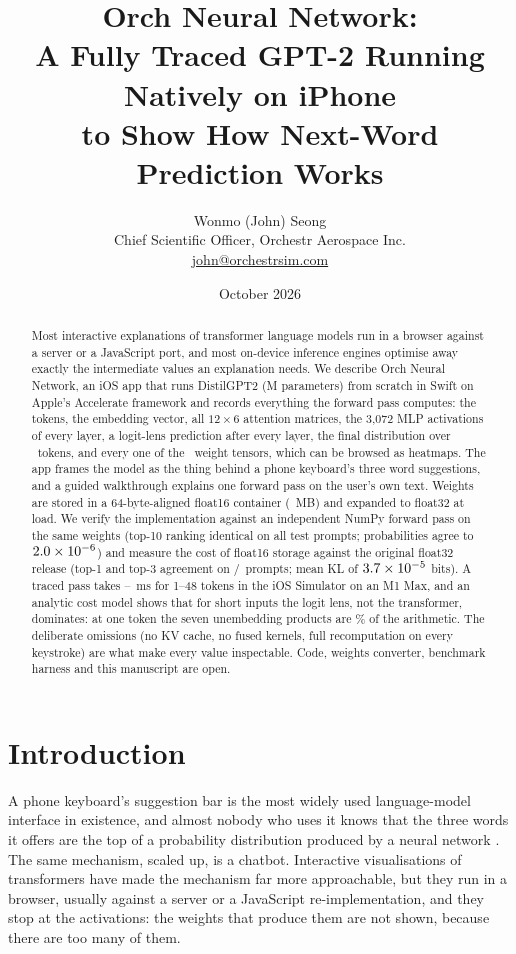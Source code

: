 \documentclass[11pt]{article}
\title{Orch Neural Network:\\A Fully Traced GPT-2 Running Natively on iPhone\\to Show How Next-Word Prediction Works}
\author{Wonmo (John) Seong\\ \small Chief Scientific Officer, Orchestr Aerospace Inc.\\ \small \href{mailto:john@orchestrsim.com}{john@orchestrsim.com}}
\date{October 2026}
\begin{document}
\maketitle

\begin{abstract}
Most interactive explanations of transformer language models run in a browser against a server or a JavaScript port, and most on-device inference engines optimise away exactly the intermediate values an explanation needs. We describe Orch Neural Network, an iOS app that runs DistilGPT2 (\NumParams M parameters) from scratch in Swift on Apple's Accelerate framework and records everything the forward pass computes: the tokens, the embedding vector, all $12\times6$ attention matrices, the 3{,}072 MLP activations of every layer, a logit-lens prediction after every layer, the final distribution over \VocabSize\ tokens, and every one of the \NumTensors\ weight tensors, which can be browsed as heatmaps. The app frames the model as the thing behind a phone keyboard's three word suggestions, and a guided walkthrough explains one forward pass on the user's own text. Weights are stored in a 64-byte-aligned float16 container (\WeightFileMB~MB) and expanded to float32 at load. We verify the implementation against an independent NumPy forward pass on the same weights (top-10 ranking identical on all test prompts; probabilities agree to $2.0\times10^{-6}$) and measure the cost of float16 storage against the original float32 release (top-1 and top-3 agreement on \FidTopOne/\FidPrompts\ prompts; mean KL of $3.7\times10^{-5}$ bits). A traced pass takes \LatShortMinSim--\LatFortyEightSim~ms for 1--48 tokens in the iOS Simulator on an M1 Max, and an analytic cost model shows that for short inputs the logit lens, not the transformer, dominates: at one token the seven unembedding products are \LensShareOne\% of the arithmetic. The deliberate omissions (no KV cache, no fused kernels, full recomputation on every keystroke) are what make every value inspectable. Code, weights converter, benchmark harness and this manuscript are open.
\end{abstract}

\section{Introduction}
A phone keyboard's suggestion bar is the most widely used language-model interface in existence, and almost nobody who uses it knows that the three words it offers are the top of a probability distribution produced by a neural network \citep{hard2018}. The same mechanism, scaled up, is a chatbot. Interactive visualisations of transformers \citep{vig2019,hoover2020,cho2024,bycroft2023} have made the mechanism far more approachable, but they run in a browser, usually against a server or a JavaScript re-implementation, and they stop at the activations: the weights that produce them are not shown, because there are too many of them.
\end{document}
